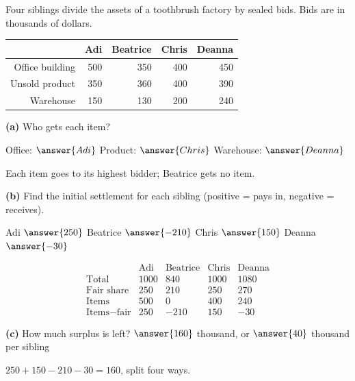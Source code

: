 \documentclass[12pt]{ximera}
\begin{document}
\begin{problem}
Four siblings divide the assets of a toothbrush factory by sealed bids. Bids are in
thousands of dollars.
\begin{center}
\begin{tabular}{r|rrrr}
 & Adi & Beatrice & Chris & Deanna\\\hline
Office building & 500 & 350 & 400 & 450\\
Unsold product & 350 & 360 & 400 & 390\\
Warehouse & 150 & 130 & 200 & 240
\end{tabular}
\end{center}

\begin{prompt}
\textbf{(a)} Who gets each item?

Office: $\answer{Adi}$ \quad Product: $\answer{Chris}$ \quad Warehouse: $\answer{Deanna}$
\begin{feedback}
Each item goes to its highest bidder; Beatrice gets no item.
\end{feedback}
\end{prompt}

\begin{prompt}
\textbf{(b)} Find the initial settlement for each sibling (positive = pays in, negative =
receives).

Adi $\answer{250}$ \quad Beatrice $\answer{-210}$ \quad Chris $\answer{150}$ \quad
Deanna $\answer{-30}$
\begin{feedback}
\[
\begin{array}{r|rrrr}
 & \text{Adi} & \text{Beatrice} & \text{Chris} & \text{Deanna}\\\hline
\text{Total} & 1000 & 840 & 1000 & 1080\\
\text{Fair share} & 250 & 210 & 250 & 270\\
\text{Items} & 500 & 0 & 400 & 240\\
\text{Items}-\text{fair} & 250 & -210 & 150 & -30
\end{array}
\]
\end{feedback}
\end{prompt}

\begin{prompt}
\textbf{(c)} How much surplus is left? $\answer{160}$ thousand, or $\answer{40}$
thousand per sibling
\begin{feedback}
$250+150-210-30=160$, split four ways.
\end{feedback}
\end{prompt}
\end{problem}
\end{document}
